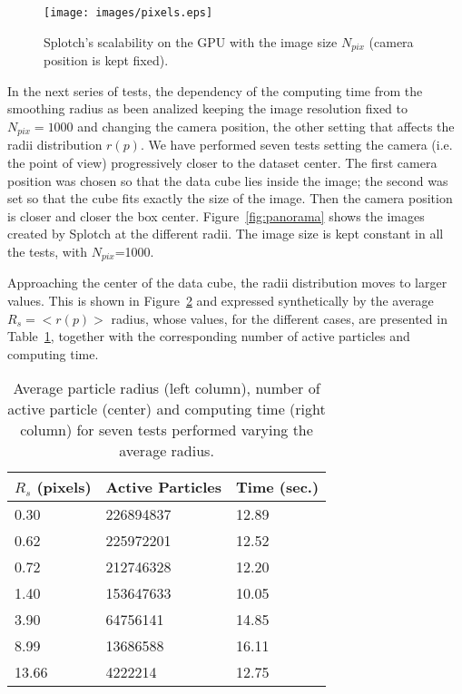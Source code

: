 \documentclass[1p]{elsarticle}
\begin{document}
\begin{figure}
\centering
\texttt{[image: images/pixels.eps]}
\caption{Splotch's scalability on the GPU with the image size $N_{pix}$ (camera position is 
kept fixed).}
\label{fig:pixels}
\end{figure}

In the next series of tests, the dependency of the computing time from the smoothing 
radius as been analized keeping the image resolution fixed to $N_{pix} = 1000$ 
and changing the camera position, the other setting that affects the radii 
distribution $r(p)$. 
We have performed seven tests
setting the camera (i.e. the point of view) progressively closer to the dataset center. 
The first camera position was chosen so that the data cube lies inside the image; the second was set so that the cube fits exactly the size of the image. Then the camera position is closer and closer the box center. Figure~\ref{fig:panorama} shows the images created by Splotch at the different radii.
The image size is kept constant in all the tests, with $N_{pix}$=1000.
 
Approaching the center of the 
data cube, the radii distribution moves to larger values. This is 
shown in Figure~\ref{fig:radii} and expressed synthetically 
by the average $R_s=<r(p)>$ radius, whose values, for the different cases, are presented in 
Table~\ref{tab:radius}, together with the corresponding number of active particles and computing time. 

\begin{figure}
\centering
\caption{
}
\label{fig:radii}
\end{figure}

\begin{table}
\begin{center}
\begin{tabular}{|l|l|l|}
\hline
$R_s$ (pixels) & Active Particles & Time (sec.) \\
\hline
0.30   & 226894837  & 12.89 \\
\hline
0.62   & 225972201  & 12.52 \\
\hline
0.72   & 212746328  & 12.20 \\
\hline
1.40   & 153647633  & 10.05 \\
\hline
3.90   & 64756141   & 14.85 \\
\hline
8.99   & 13686588   & 16.11 \\
\hline
13.66  & 4222214    & 12.75 \\
\hline
\end{tabular}
\end{center}
\caption{Average particle radius (left column), number of active particle (center)
and computing time (right column) for seven tests performed varying the average radius.}
\label{tab:radius}
\end{table}
\end{document}
